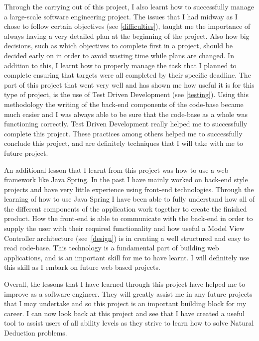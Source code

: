 Through the carrying out of this project, I also learnt how to successfully manage a large-scale software engineering project. The issues that I had midway as I chose to follow certain objectives (see \ref{difficulties}), taught me the importance of always having a very detailed plan at the beginning of the project. Also how big decisions, such as which objectives to complete first in a project, should be decided early on in order to avoid wasting time while plans are changed. In addition to this, I learnt how to properly manage the task that I planned to complete ensuring that targets were all completed by their specific deadline. The part of this project that went very well and has shown me how useful it is for this type of project, is the use of Test Driven Development (see \ref{testing}). Using this methodology the writing of the back-end components of the code-base became much easier and I was always able to be sure that the code-base as a whole was functioning correctly. Test Driven Development really helped me to successfully complete this project. These practices among others helped me to successfully conclude this project, and are definitely techniques that I will take with me to future project.

An additional lesson that I learnt from this project was how to use a web framework like Java Spring. In the past I have mainly worked on back-end style projects and have very little experience using front-end technologies. Through the learning of how to use Java Spring I have been able to fully understand how all of the different components of the application work together to create the finished product. How the front-end is able to communicate with the back-end in order to supply the user with their required functionality and how useful a Model View Controller architecture (see~\ref{design}) is in creating a well structured and easy to read code-base. This technology is a fundamental part of building web applications, and is an important skill for me to have learnt. I will definitely use this skill as I embark on future web based projects.

Overall, the lessons that I have learned through this project have helped me to improve as a software engineer. They will greatly assist me in any future projects that I may undertake and so this project is an important building block for my career. I can now look back at this project and see that I have created a useful tool to assist users of all ability levels as they strive to learn how to solve Natural Deduction problems.

